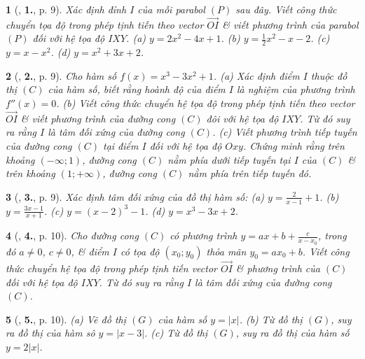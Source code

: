 \documentclass{article}
\newtheorem{baitoan}{}
\begin{document}
\begin{baitoan}[\cite{TLCT_giai_tich_12}, \textbf{1.}, p. 9]
	Xác định đỉnh $I$ của mỗi parabol $(P)$ sau đây. Viết công thức chuyển tọa độ trong phép tịnh tiến theo vector $\overrightarrow{OI}$ \& viết phương trình của parabol $(P)$ đối với hệ tọa độ $IXY$. (a) $y = 2x^2 - 4x + 1$. (b) $y = \frac{1}{2}x^2 - x - 2$. (c) $y = x - x^2$. (d) $y = x^2 + 3x + 2$.
\end{baitoan}

\begin{baitoan}[\cite{TLCT_giai_tich_12}, \textbf{2.}, p. 9]
	Cho hàm số $f(x) = x^3 - 3x^2 + 1$. (a) Xác định điểm $I$ thuộc đồ thị $(C)$ của hàm số, biết rằng hoành độ của điểm $I$ là nghiệm của phương trình $f''(x) = 0$. (b) Viết công thức chuyển hệ tọa độ trong phép tịnh tiến theo vector $\overrightarrow{OI}$ \& viết phương trình của đường cong $(C)$ đôi với hệ tọa độ $IXY$. Từ đó suy ra rằng $I$ là tâm đối xứng của đường cong $(C)$. (c) Viết phương trình tiếp tuyến của đường cong $(C)$ tại điểm $I$ đối với hệ tọa độ $Oxy$. Chứng minh rằng trên khoảng $(-\infty;1)$, đường cong $(C)$ nằm phía dưới tiếp tuyến tại $I$ của $(C)$ \& trên khoảng $(1;+\infty)$, đường cong $(C)$ nằm phía trên tiếp tuyến đó.
\end{baitoan}

\begin{baitoan}[\cite{TLCT_giai_tich_12}, \textbf{3.}, p. 9]
	Xác định tâm đối xứng của đồ thị hàm số: (a) $y = \frac{2}{x - 1} + 1$. (b) $y = \frac{3x - 1}{x + 1}$. (c) $y = (x - 2)^3 - 1$. (d) $y = x^3 - 3x + 2$.
\end{baitoan}

\begin{baitoan}[\cite{TLCT_giai_tich_12}, \textbf{4.}, p. 10]
	Cho đường cong $(C)$ có phương trình $y = ax + b + \frac{c}{x - x_0}$, trong đó $a\ne 0$, $c\ne 0$, \& điểm $I$ có tọa độ $(x_0;y_0)$ thỏa mãn $y_0 = ax_0 + b$. Viết công thức chuyển hệ tọa độ trong phép tịnh tiến vector $\overrightarrow{OI}$ \& phương trình của $(C)$ đối với hệ tọa độ $IXY$. Từ đó suy ra rằng $I$ là tâm đối xứng của đường cong $(C)$.
\end{baitoan}

\begin{baitoan}[\cite{TLCT_giai_tich_12}, \textbf{5.}, p. 10]
	(a) Vẽ đồ thị $(G)$ của hàm số $y = |x|$. (b) Từ đồ thị $(G)$, suy ra đồ thị của hàm sô $y = |x - 3|$. (c) Từ đồ thị $(G)$, suy ra đồ thị của hàm số $y = 2|x|$.
\end{baitoan}
\end{document}
